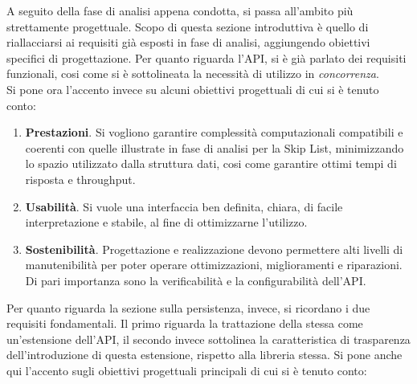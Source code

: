 

	A seguito della fase di analisi appena condotta, si passa all'ambito più strettamente progettuale. Scopo di questa sezione introduttiva è quello di riallacciarsi ai requisiti già esposti in fase di analisi, aggiungendo obiettivi specifici di progettazione. Per quanto riguarda l'API, si è già parlato dei requisiti funzionali, cosi come si è sottolineata la necessità di utilizzo in \textit{concorrenza}. \\
	Si pone ora l'accento invece su alcuni obiettivi progettuali di cui si è tenuto conto:
	
	\begin{enumerate}
		\item \textbf{Prestazioni}. Si vogliono garantire complessità computazionali compatibili e coerenti con quelle illustrate in fase di analisi per la Skip List, minimizzando lo spazio utilizzato dalla struttura dati, cosi come garantire ottimi tempi di risposta e throughput.
	  	\item \textbf{Usabilità}. Si vuole una interfaccia ben definita, chiara, di facile interpretazione e stabile, al fine di ottimizzarne l'utilizzo.
	  	\item \textbf{Sostenibilità}. Progettazione e realizzazione devono permettere alti livelli di manutenibilità per poter operare ottimizzazioni, miglioramenti e riparazioni. Di pari importanza sono la verificabilità e la configurabilità dell'API.
	\end{enumerate}
	 
	Per quanto riguarda la sezione sulla persistenza, invece, si ricordano i due requisiti fondamentali. Il primo riguarda la trattazione della stessa come un'estensione dell'API, il secondo invece sottolinea la caratteristica di trasparenza dell'introduzione di questa estensione, rispetto alla libreria stessa.
	Si pone anche qui l'accento sugli obiettivi progettuali principali di cui si è tenuto conto:
	
